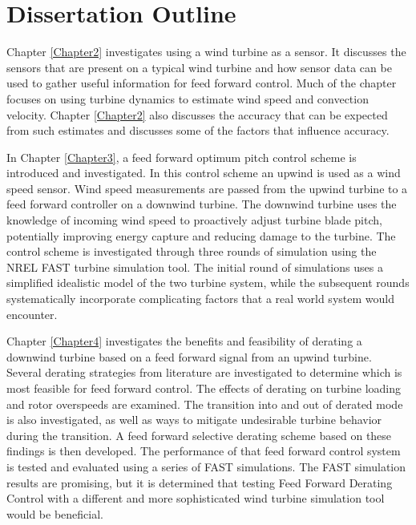 
\section{Dissertation Outline}

Chapter \ref{Chapter2} investigates using a wind turbine as a sensor. It discusses the sensors that are present on a typical wind turbine and how sensor data can be used to gather useful information for feed forward control. Much of the chapter focuses on using turbine dynamics to estimate wind speed and convection velocity. Chapter \ref{Chapter2} also discusses the accuracy that can be expected from such estimates and discusses some of the factors that influence accuracy. 

In Chapter \ref{Chapter3}, a feed forward optimum pitch control scheme is introduced and investigated. In this control scheme an upwind is used as a wind speed sensor. Wind speed measurements are passed from the upwind turbine to a feed forward controller on a downwind turbine. The downwind turbine uses the knowledge of incoming wind speed to proactively adjust turbine blade pitch, potentially improving energy capture and reducing damage to the turbine. The control scheme is investigated through three rounds of simulation using the NREL FAST turbine simulation tool. The initial round of simulations uses a simplified idealistic model of the two turbine system, while the subsequent rounds systematically incorporate complicating factors that a real world system would encounter.  

Chapter \ref{Chapter4} investigates the benefits and feasibility of derating a downwind turbine based on a feed forward signal from an upwind turbine. Several derating strategies from literature are investigated to determine which is most feasible for feed forward control. The effects of derating on turbine loading and rotor overspeeds are examined. The transition into and out of derated mode is also investigated, as well as ways to mitigate undesirable turbine behavior during the transition. A feed forward selective derating scheme based on these findings is then developed. The performance of that feed forward control system is tested and evaluated using a series of FAST simulations. The FAST simulation results are promising, but it is determined that testing Feed Forward Derating Control with a different and more sophisticated wind turbine simulation tool would be beneficial.
  
